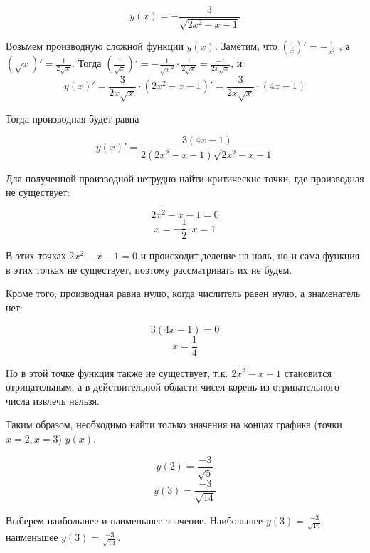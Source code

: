 \documentclass[a4paper]{article}
\begin{document}
\begin{equation}
	y(x)=-\frac{3}{\sqrt{2x^2-x-1}}
\end{equation}

Возьмем производную сложной функции $y(x)$. Заметим, что $(\frac{1}{x})'=-\frac{1}{x^2}$
, а $(\sqrt{x})'=\frac{1}{2\sqrt{x}}$. Тогда $(\frac{1}{\sqrt{x}})'=-\frac{1}{\sqrt{x}^2}\cdot\frac{1}{2\sqrt{x}}=\frac{-1}{2x\sqrt{x}}$, и 
\begin{equation}
	y(x)'=\frac{3}{2x\sqrt{x}}\cdot(2x^2-x-1)'=\frac{3}{2x\sqrt{x}}\cdot(4x-1)
\end{equation}

Тогда производная будет равна

\begin{equation}
	y(x)'=\frac{3(4x-1)}{2(2x^2-x-1)\sqrt{2x^2-x-1}}
\end{equation}

Для полученной производной нетрудно найти критические точки, где производная не существует: 

	$$2x^2-x-1=0$$
	$$x=-\frac{1}{2}, x=1$$

В этих точках $2x^2-x-1=0$ и происходит деление на ноль, но и сама функция в этих точках не существует, поэтому рассматривать их не будем.

Кроме того, производная равна нулю, когда числитель равен нулю, а знаменатель нет:

	$$3(4x-1)=0$$
	$$x=\frac{1}{4}$$

Но в этой точке функция также не существует, т.к. $2x^2-x-1$ становится отрицательным, а в действительной области чисел корень из отрицательного числа извлечь нельзя.

Таким образом, необходимо найти только значения на концах графика (точки $x=2, x=3$) $y(x)$.

$$y(2)=\frac{-3}{\sqrt{5}}$$
$$y(3)=\frac{-3}{\sqrt{14}}$$

Выберем наибольшее и наименьшее значение. Наибольшее $y(3)=\frac{-3}{\sqrt{14}}$, наименьшее $y(3)=\frac{-3}{\sqrt{14}}$.
\end{document}
